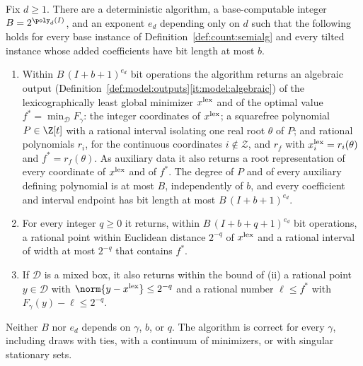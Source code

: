\begin{theorem}\label{thm:count:fallback}
Fix $d\ge1$. There are a deterministic algorithm, a base-computable integer
$B=2^{\poly_d(I)}$, and an exponent $e_d$ depending only on $d$ such that the
following holds for every base instance of Definition~\ref{def:count:semialg}
and every tilted instance whose added coefficients have bit length at most
$b$.
\begin{enumerate}[label=(\roman*)]
\item Within $B\,(I+b+1)^{e_d}$ bit operations the algorithm returns an
 algebraic output
 (Definition~\ref{def:model:outputs}\ref{it:model:algebraic}) of the
 lexicographically least global minimizer $x^{\rm lex}$ and of the optimal
 value $f^*=\min_{\mathcal D}F_\gamma$: the integer coordinates of
 $x^{\rm lex}$; a squarefree polynomial $P\in\Z[t]$ with a rational interval
 isolating one real root $\theta$ of $P$; and rational polynomials $r_i$, for
 the continuous coordinates $i\notin\mathcal Z$, and $r_f$ with
 $x^{\rm lex}_i=r_i(\theta)$ and $f^*=r_f(\theta)$. As auxiliary data it also
 returns a root representation of every coordinate of $x^{\rm lex}$ and of
 $f^*$. The degree of $P$ and of every auxiliary defining polynomial is at
 most $B$, independently of $b$, and every coefficient and interval endpoint
 has bit length at most $B\,(I+b+1)^{e_d}$.
\item For every integer $q\ge0$ it returns, within $B\,(I+b+q+1)^{e_d}$ bit
 operations, a rational point within Euclidean distance $2^{-q}$ of
 $x^{\rm lex}$ and a rational interval of width at most $2^{-q}$ that
 contains $f^*$.
\item If $\mathcal D$ is a mixed box, it also returns within the bound of (ii)
 a rational point $y\in\mathcal D$ with $\norm{y-x^{\rm lex}}\le2^{-q}$ and a
 rational number $\ell\le f^*$ with $F_\gamma(y)-\ell\le2^{-q}$.
\end{enumerate}
Neither $B$ nor $e_d$ depends on $\gamma$, $b$, or $q$. The algorithm is
correct for every $\gamma$, including draws with ties, with a continuum of
minimizers, or with singular stationary sets.
\end{theorem}

